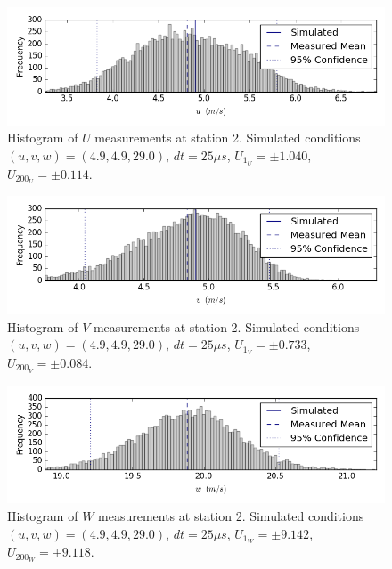 \begin{figure}[H]
\centering
\includegraphics[width=6in]{figs/Ely_May28th02001/uncertainty_Ely_May28th02001_U}
\caption{Histogram of $U$ measurements at station 2. Simulated conditions 
$(u,v,w)=(4.9, 4.9, 29.0)$, $dt=25 \mu s$, $U_{1_{U}}=\pm 1.040$, 
$U_{200_{U}}=\pm 0.114$.}
\label{fig:uncertainty_Ely_May28th02001_U}
\end{figure}


\begin{figure}[H]
\centering
\includegraphics[width=6in]{figs/Ely_May28th02001/uncertainty_Ely_May28th02001_V}
\caption{Histogram of $V$ measurements at station 2. Simulated conditions 
$(u,v,w)=(4.9, 4.9, 29.0)$, $dt=25 \mu s$, $U_{1_{V}}=\pm 0.733$, 
$U_{200_{V}}=\pm 0.084$.}
\label{fig:uncertainty_Ely_May28th02001_V}
\end{figure}


\begin{figure}[H]
\centering
\includegraphics[width=6in]{figs/Ely_May28th02001/uncertainty_Ely_May28th02001_W}
\caption{Histogram of $W$ measurements at station 2. Simulated conditions 
$(u,v,w)=(4.9, 4.9, 29.0)$, $dt=25 \mu s$, $U_{1_{W}}=\pm 9.142$, 
$U_{200_{W}}=\pm 9.118$.}
\label{fig:uncertainty_Ely_May28th02001_W}
\end{figure}


